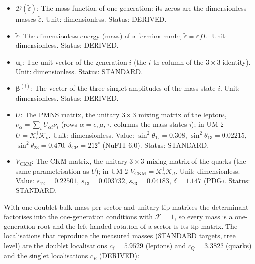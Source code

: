 \documentclass[
  10pt,
]{article}
\begin{document}
\begin{itemize}
  mass state \(i\) (the left-handed flavour content). Unit:
  dimensionless. Status: DERIVED.
\item
  \(\mathcal{D}(\tilde\varepsilon)\): The mass function of one
  generation: its zeros are the dimensionless masses
  \(\tilde\varepsilon\). Unit: dimensionless. Status: DERIVED.
\item
  \(\tilde\varepsilon\): The dimensionless energy (mass) of a fermion
  mode, \(\tilde\varepsilon = \varepsilon fL\). Unit: dimensionless.
  Status: DERIVED.
\item
  \(\mathbf{u}_i\): The unit vector of the generation \(i\) (the
  \(i\)-th column of the \(3 \times 3\) identity). Unit: dimensionless.
  Status: STANDARD.
\item
  \(\boldsymbol{\beta}^{(i)}\): The vector of the three singlet
  amplitudes of the mass state \(i\). Unit: dimensionless. Status:
  DERIVED.
\item
  \(U\): The PMNS matrix, the unitary \(3 \times 3\) mixing matrix of
  the leptons, \(\nu_\alpha = \sum_iU_{\alpha i}\nu_i\) (rows
  \(\alpha = e, \mu, \tau\), columns the mass states \(i\)); in UM-2
  \(U = \mathcal{K}_e^\dagger\mathcal{K}_\nu\). Unit: dimensionless.
  Value: \(\sin^2\theta_{12} = 0.308\), \(\sin^2\theta_{13} = 0.02215\),
  \(\sin^2\theta_{23} = 0.470\), \(\delta_{\mathrm{CP}} = 212^\circ\)
  (NuFIT 6.0). Status: STANDARD.
\item
  \(V_{\mathrm{CKM}}\): The CKM matrix, the unitary \(3 \times 3\)
  mixing matrix of the quarks (the same parametrisation as \(U\)); in
  UM-2 \(V_{\mathrm{CKM}} = \mathcal{K}_u^\dagger\mathcal{K}_d\). Unit:
  dimensionless. Value: \(s_{12} = 0.22501\), \(s_{13} = 0.003732\),
  \(s_{23} = 0.04183\), \(\delta = 1.147\) (PDG). Status: STANDARD.
\end{itemize}

With one doublet bulk mass per sector and unitary tip matrices the
determinant factorises into the one-generation conditions with
\(\mathcal{K} = 1\), so every mass is a one-generation root and the
left-handed rotation of a sector is its tip matrix. The localisations
that reproduce the measured masses (STANDARD targets, tree level) are
the doublet localisations \(c_\ell = 5.9529\) (leptons) and
\(c_Q = 3.3823\) (quarks) and the singlet localisations \(c_R\)
(DERIVED):
\end{document}
